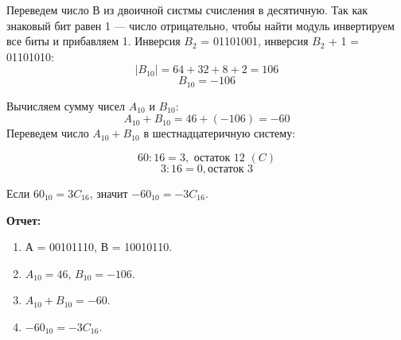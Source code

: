 \documentclass[a4paper, 12pt]{article}
\begin{document}
Переведем число В из двоичной систмы счисления в десятичную. Так как знаковый бит равен 1 --- число отрицательно, чтобы найти модуль инвертируем все биты и прибавляем 1. 
Инверсия $B_2$ = 01101001, инверсия $B_2$ + 1 = 01101010:
$$|B_{10}| = 64 + 32 + 8 + 2 = 106$$
$$B_{10} = -106$$

Вычисляем сумму чисел $A_{10}$ и $B_{10}$:
$$A_{10} + B_{10} = 46 + (-106) = -60$$
Переведем число $A_{10} + B_{10}$ в шестнадцатеричную систему:

$$60 : 16 = 3, \text{ остаток 12 } (C)$$
$$3 : 16 = 0,  \text{остаток } 3$$

Если $60_{10} = 3C_{16}$, значит $-60_{10} = -3C_{16}$.
\vspace{1cm}

\textbf{Отчет:}
\begin{enumerate}[nosep]
    \item А = 00101110, В = 10010110.
    \item $A_{10} = 46$, $B_{10} = -106$.
    \item $A_{10} + B_{10} = -60$.
    \item $-60_{10} = -3C_{16}$.
\end{enumerate}
\end{document}
